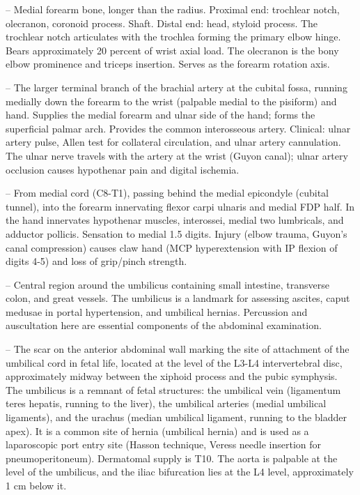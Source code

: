 -- Medial forearm bone, longer than the radius. Proximal end: trochlear notch, olecranon, coronoid process. Shaft. Distal end: head, styloid process. The trochlear notch articulates with the trochlea forming the primary elbow hinge. Bears approximately 20 percent of wrist axial load. The olecranon is the bony elbow prominence and triceps insertion. Serves as the forearm rotation axis.

-- The larger terminal branch of the brachial artery at the cubital fossa, running medially down the forearm to the wrist (palpable medial to the pisiform) and hand. Supplies the medial forearm and ulnar side of the hand; forms the superficial palmar arch. Provides the common interosseous artery. Clinical: ulnar artery pulse, Allen test for collateral circulation, and ulnar artery cannulation. The ulnar nerve travels with the artery at the wrist (Guyon canal); ulnar artery occlusion causes hypothenar pain and digital ischemia.

-- From medial cord (C8-T1), passing behind the medial epicondyle (cubital tunnel), into the forearm innervating flexor carpi ulnaris and medial FDP half. In the hand innervates hypothenar muscles, interossei, medial two lumbricals, and adductor pollicis. Sensation to medial 1.5 digits. Injury (elbow trauma, Guyon's canal compression) causes claw hand (MCP hyperextension with IP flexion of digits 4-5) and loss of grip/pinch strength.

-- Central region around the umbilicus containing small intestine, transverse colon, and great vessels. The umbilicus is a landmark for assessing ascites, caput medusae in portal hypertension, and umbilical hernias. Percussion and auscultation here are essential components of the abdominal examination.

-- The scar on the anterior abdominal wall marking the site of attachment of the umbilical cord in fetal life, located at the level of the L3-L4 intervertebral disc, approximately midway between the xiphoid process and the pubic symphysis. The umbilicus is a remnant of fetal structures: the umbilical vein (ligamentum teres hepatis, running to the liver), the umbilical arteries (medial umbilical ligaments), and the urachus (median umbilical ligament, running to the bladder apex). It is a common site of hernia (umbilical hernia) and is used as a laparoscopic port entry site (Hasson technique, Veress needle insertion for pneumoperitoneum). Dermatomal supply is T10. The aorta is palpable at the level of the umbilicus, and the iliac bifurcation lies at the L4 level, approximately 1 cm below it.

